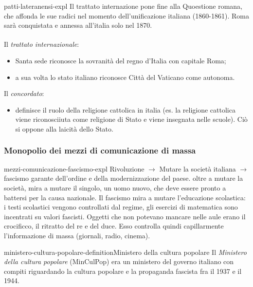 \documentclass[preview]{standalone}
\begin{document}
\begin{snippet}{patti-lateranensi-expl}
    Il trattato internazione pone fine alla Quoestione romana, che affonda
    le sue radici nel momento dell'unificazione italiana (1860-1861).
    Roma sarà conquistata e annessa all'italia solo nel 1870.
    \\\\
    Il \textit{trattato internazionale}:
    \begin{itemize}
        \item Santa sede riconosce la sovranità del regno d'Italia con capitale Roma;
        \item a sua volta lo stato italiano riconosce Città del Vaticano come autonoma.
    \end{itemize}
    Il \textit{concordato}:
    \begin{itemize}
        \item definisce il ruolo della religione cattolica in italia (es. la religione cattolica
        viene riconosciiuta come religione di Stato e viene insegnata nelle scuole).
        Ciò si oppone alla laicità dello Stato.
    \end{itemize}
\end{snippet}

\subsubsection{Monopolio dei mezzi di comunicazione di massa}

\begin{snippet}{mezzi-comunicazione-fascismo-expl}
    Rivoluzione \(\rightarrow\) Mutare la società italiana \(\rightarrow\) fascismo garante
    dell'ordine e della modernizzazione del paese.
    oltre a mutare la società, mira a mutare il singolo, un uomo nuovo, che deve
    essere pronto a battersi per la causa nazionale.
    Il fascismo mira a mutare l'educazione scolastica: i testi scolastici
    vengono controllati dal regime, gli esercizi di matematica sono incentrati
    su valori fascisti. Oggetti che non potevano mancare nelle aule erano il crocificco,
    il ritratto del re e del duce.
    Esso controlla quindi capillarmente l'informazione di massa (giornali, radio,
    cinema).
\end{snippet}

\begin{snippetdefinition}{ministero-cultura-popolare-definition}{Ministero della cultura popolare}
    Il \textit{Ministero della cultura popolare} (MinCulPop) era un ministero
    del governo italiano con compiti riguardando la cultura popolare
    e la propaganda fascista fra il 1937 e il 1944.
\end{snippetdefinition}
\end{document}
